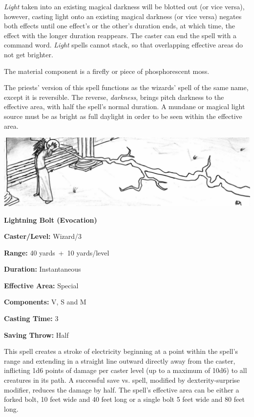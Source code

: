 \begin{multicols}{2}
\textit{Light} taken into an existing magical darkness will be blotted out (or vice versa), however, casting light onto an existing magical darkness (or vice versa) negates both effects until one effect's or the other's duration ends, at which time, the effect with the longer duration reappears.  The caster can end the spell with a command word.  \textit{Light} spells cannot stack, so that overlapping effective areas do not get brighter.

The material component is a firefly or piece of phosphorescent moss.

The priests' version of this spell functions as the wizards' spell of the same name, except it is reversible.  The reverse, \textit{darkness}, brings pitch darkness to the effective area, with half the spell's normal duration.  A mundane or magical light source must be as bright as full daylight in order to be seen within the effective area.  

\vspace{1em}

\noindent\includegraphics[width=\columnwidth]{lightningbolt.pdf}\label{lightningbolt}

\vspace{1em}

\noindent
\begin{minipage}{\columnwidth}

\noindent \textbf{Lightning Bolt (Evocation)}

\noindent \textbf{Caster/Level:} Wizard/3

\noindent \textbf{Range:} 40 yards~+~10 yards/level

\noindent \textbf{Duration:} Instantaneous

\noindent \textbf{Effective Area:} Special

\noindent \textbf{Components:} V, S and M

\noindent \textbf{Casting Time:} 3

\noindent \textbf{Saving Throw:} Half

\end{minipage}

This spell creates a stroke of electricity beginning at a point within the spell's range and extending in a straight line outward directly away from the caster, inflicting 1d6 points of damage per caster level (up to a maximum of 10d6) to all creatures in its path.  A successful save vs. spell, modified by dexterity-surprise modifier, reduces the damage by half.  The spell's effective area can be either a forked bolt, 10 feet wide and 40 feet long or a single bolt 5 feet wide and 80 feet long.  


\end{multicols}
